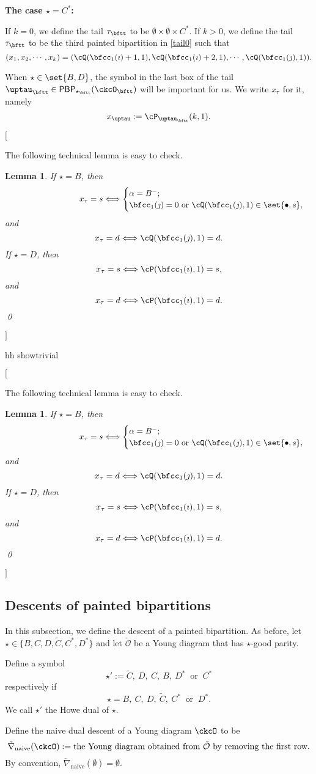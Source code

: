 \documentclass[12pt,a4paper]{amsart}
\newcommand{\trivial}[2][]{\if\relax\detokenize{#1}\relax
  {%
      \color{orange} \vspace{0em} $[$  #2 $]$
      \color{black}
  }
  \else
\ifx#1h
\ifcsname showtrivial\endcsname
{%
    \color{orange} \vspace{0em}  $[$ #2 $]$
    \color{black}
}
\fi
\else {\red Wrong argument!} \fi
\fi
}
\newcommand{\CO}{{\mathcal {O}}}
\def\DD{\nabla}
\numberwithin{equation}{section}
\newtheorem{lem}[thm]{Lemma}
\theoremstyle{remark}
\def\DD{\nabla}
\def\PBP{\mathsf{PBP}}
\def\tnaive{\mathrm{naive}}
\def\ckDD{{\check\DD}}
\def\DD{\nabla}
\def\ckDDn{{\ckDD}_{\tnaive}}
\begin{document}
{\bfseries The case $\star = C^*$:}

If $k=0$, we define the tail $\tau_{\bftt}$ to be
$\emptyset\times \emptyset \times C^{*}$.
If $k> 0$, we define the tail $\tau_\bftt$ to be the third painted bipartition in \eqref{tail0} such that
\[
  (x_1, x_2, \cdots, x_k)= (\cQ(\bfcc_{1}(\imath)+1,1),\cQ(\bfcc_{1}(\imath)+2,1),\cdots, \cQ(\bfcc_{1}(\jmath),1)).
\]


 When $\star \in \set{B,D}$, the symbol in the last box of the tail $\uptau_\bftt\in \PBP_{\star_\bftt}(\ckcO_\bftt)$ will be important for us. We write $x_\uptau$ for it, namely
\[
x_\uptau := \cP_{\uptau_\bftt}(k,1).
\]


\trivial[h]{

 The following technical lemma is easy to check.

\begin{lem}\label{tailtip}
If $\star=B$, then
\[
\hspace{9em} x_\tau=s\Longleftrightarrow
\begin{cases}
  \alpha=B^-;\\
  \bfcc_1(\jmath)=0 \text{ or }\cQ(\bfcc_{1}(\jmath),1) \in\set{\bullet, s},
  \end{cases}
\]
and
\[
x_\tau=d \Longleftrightarrow
\cQ(\bfcc_{1}(\jmath),1) =d.
\]
If $\star=D$, then
\[
x_\tau=s\Longleftrightarrow \cP(\bfcc_{1}(\imath),1) = s,
\]
and
\[
x_\tau=d\Longleftrightarrow \cP(\bfcc_{1}(\imath),1) =d.
\]
\qed
\end{lem}
}

\subsection{Descents of painted bipartitions}\label{sec:comb}


In this subsection, we define the descent of a painted bipartition.
As before, let  $\star\in \{ B, C,  D, \widetilde{C},  C^*, D^*\}$ and let $\check \CO$ be a Young diagram that has $\star$-good parity.


Define a symbol
\[
\star':=\widetilde{C}, \ D, \  C, \ B, \ D^*\  \textrm{ or } \ C^*
\]
respectively if
\[
\star=B,\  C, \ D, \ \widetilde{C}, \ C^* \ \textrm{ or }\  D^*.
\]
We call $\star'$
 the Howe dual of $\star$.

 Define the naive dual descent of a Young diagram $\ckcO$ to be
 \[
  \ckDDn(\ckcO):= \textrm{the Young diagram obtained from $\check \CO$ by removing the first row}.
  \]
   By convention, $\check \nabla_{\mathrm{naive}}(\emptyset)=\emptyset$.
\end{document}
